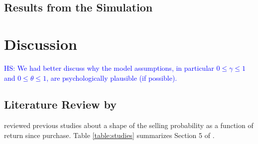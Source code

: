 \documentclass[11pt, a4paper]{article}
\newcommand{\HS}[1]{\textcolor{blue}{HS: #1}}
\begin{document}
\subsection{Results from the Simulation}




\section{Discussion}
\HS{We had better discuss why the model assumptions, in particular $0\leq \gamma \leq 1$ and $0\leq \theta \leq 1$, are psychologically plausible (if possible).}



\clearpage
\begin{appendices}
\section{Literature Review by \citet{BenDavidHirshleifer12}}
	\label{appendix:bendavid_hirshleifer}
	\renewcommand*{\thetable}{A\arabic{table}}%
	\renewcommand*{\thefigure}{A\arabic{figure}}%
	\renewcommand*{\theequation}{A\arabic{equation}}%
	\setcounter{table}{0}
	\setcounter{figure}{0}
	\setcounter{equation}{0}

\citet{BenDavidHirshleifer12} reviewed previous studies about a shape of the selling probability as a function of return since purchase. Table \ref{table:studies} summarizes Section 5 of \citet{BenDavidHirshleifer12}.


\end{appendices}
\end{document}
